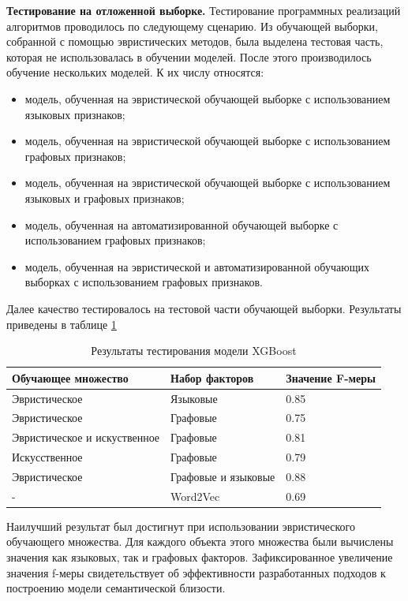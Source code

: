 \textbf{Тестирование на отложенной выборке.}
Тестирование программных реализаций алгоритмов проводилось по следующему сценарию. Из обучающей выборки, собранной с помощью эвристических методов, была выделена тестовая часть, которая не использовалась в обучении моделей. После этого производилось обучение нескольких моделей. К их числу относятся:
\begin{itemize}
    \item модель, обученная на эвристической обучающей выборке с использованием языковых признаков;
    \item модель, обученная на эвристической обучающей выборке с использованием графовых признаков;
    \item модель, обученная на эвристической обучающей выборке с использованием языковых и графовых признаков;
    \item модель, обученная на автоматизированной обучающей выборке с использованием графовых признаков;
    \item модель, обученная на эвристической и автоматизированной обучающих выборках с использованием графовых признаков.
\end{itemize}

Далее качество тестировалось на тестовой части обучающей выборки. Результаты приведены в таблице \ref{tbl:sim_res}

\begin{table}[htb]
\begin{tabularx}{16cm}{|X|X|X|}
        \hline
        Обучающее множество & Набор факторов & Значение F-меры \\ \hline
        Эвристическое & Языковые & 0.85 \\ \hline
        Эвристическое & Графовые & 0.75 \\ \hline
        Эвристическое и искуственное & Графовые & 0.81 \\ \hline
        Искусственное & Графовые & 0.79 \\ \hline 
        Эвристическое & Графовые и языковые & 0.88 \\ \hline
        - & Word2Vec & 0.69 \\ \hline 
\end{tabularx}
\caption{Результаты тестирования модели XGBoost} \label{tbl:sim_res}
\end{table}

Наилучший результат был достигнут при использовании эвристического обучающего множества. Для каждого объекта этого множества были вычислены значения как языковых, так и графовых факторов. Зафиксированное увеличение значения f-меры свидетельствует об эффективности разработанных подходов к построению модели семантической близости.

